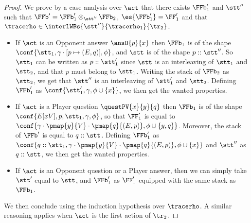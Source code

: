 \begin{proof}
We prove by a case analysis over $\act$
that there exists $\FFb'_1$ and $\stt''$
such that $\FFb' = \FFb'_1 \otimes_{\stt''} \FFb_2$,
$\es{\FFb'_1} = \FF'_1$
and that $\tracerho \in \interlWBs{\stt''}{\tracerho_1}{\tr_2}$.
\begin{itemize}
  \item If $\act$ is an Opponent answer
  $\ansO{p}{x}$ then $\FFb_1$ is of the shape
  $\conf{\stt_1,\gamma\cdot [p \mapsto (E,q)],\phi}$,
  and $\stt$ is of the shape $p::\stt''$.
  So $\stt_1$ can be written as $p::\stt'_1$
  since $\stt$ is an interleaving of $\stt_1$ and $\stt_2$,
  and that $p$ must belong to $\stt_1$.
  Writing the stack of $\FFb_2$
  as $\stt_2$, we get that
  $\stt''$ is an interleaving of $\stt'_1$ and $\stt_2$.
  Defining $\FFb'_1$ as 
  $\conf{\stt'_1,\gamma,\phi \cup \{x\}}$,
  we then get the wanted properties.
  \item If $\act$ is a Player question
  $\questPV{x}{y}{q}$
  then $\FFb_1$ is of the shape
  $\conf{E[xV],p,\stt_1,\gamma,\phi}$,
  so that $\FF'_1$ is equal to
  $\conf{\gamma \cdot \pmap{y}{V}\cdot \pmap{q}{(E,p)},\phi \cup \{y,q\}}$.
  Moreover, the stack of $\FFb'$ is equal to
  $q::\stt$.
  Defining $\FFb'_1$ as 
  $\conf{q::\stt_1,\gamma \cdot \pmap{y}{V}\cdot \pmap{q}{(E,p)},\phi \cup \{x\}}$
  and $\stt''$ as $q::\stt$,
  we then get the wanted properties.
  \item If $\act$ is an Opponent question or a Player answer,
  then we can simply take $\stt'$ equal to $\stt$,
  and $\FFb'_1$ as $\FF'_1$ equipped with the same stack
  as $\FFb_1$.
\end{itemize}
\noindent
We then conclude using the induction hypothesis over $\tracerho$.
A similar reasoning applies when $\act$ is the first action of $\tr_2$.
\end{proof}


